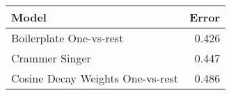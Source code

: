\begin{tabular}{lr}
\toprule
                           Model &  Error \\
\midrule
        Boilerplate One-vs-rest  &  0.426 \\
                  Crammer Singer &  0.447 \\
Cosine Decay Weights One-vs-rest &  0.486 \\
\bottomrule
\end{tabular}

